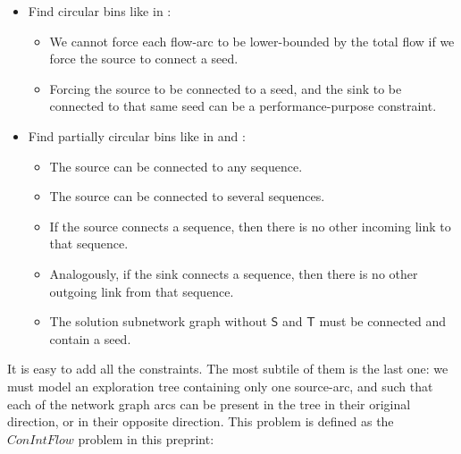 \begin{itemize}
  \item Find circular bins like in :
    \begin{itemize}
      \item We cannot force each flow-arc to be lower-bounded by the total flow if we force the source to connect a seed.
      \item Forcing the source to be connected to a seed, and the sink to be connected to that same seed can be a performance-purpose constraint.
    \end{itemize}
  \item Find partially circular bins like in  and :
    \begin{itemize}
      \item The source can be connected to any sequence.
      \item The source can be connected to several sequences.
      \item If the source connects a sequence, then there is no other incoming link to that sequence.
      \item Analogously, if the sink connects a sequence, then there is no other outgoing link from that sequence.
      \item The solution subnetwork graph without \(\mathsf{S}\) and \(\mathsf{T}\) must be connected and contain a seed.
    \end{itemize}
\end{itemize}

It is easy to add all the constraints.
The most subtile of them is the last one: we must model an exploration tree containing only one source-arc, and such that each of the network graph arcs can be present in the tree in their original direction, or in their opposite direction.
This problem is defined as the \(ConIntFlow\) problem in this preprint:~\cite{epainMixedIntegerLinear2025}